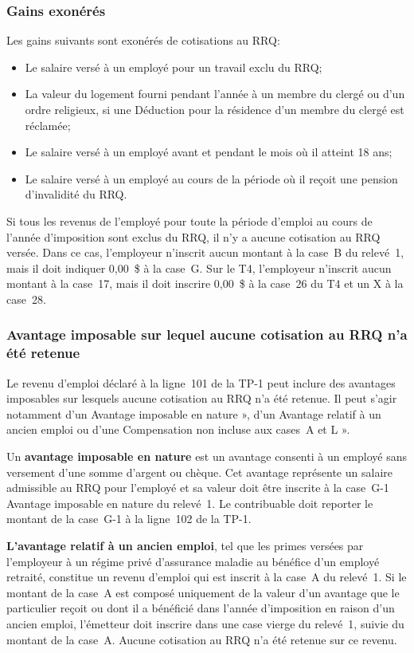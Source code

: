 \subsubsection{Gains exonérés}
Les gains suivants sont exonérés de cotisations au RRQ:
\begin{itemize}
	\item Le salaire versé à un employé pour un travail exclu du RRQ; 
	\item La valeur du logement fourni pendant l'année à un membre du clergé ou d'un ordre religieux, si une \og Déduction pour la résidence d'un membre du clergé \fg{} est réclamée;
	\item Le salaire versé à un employé avant et pendant le mois où il atteint 18 ans; 
	\item Le salaire versé à un employé au cours de la période où il reçoit une pension d'invalidité du RRQ.
\end{itemize}
\begin{note}
	Si tous les revenus de l'employé pour toute la période d'emploi au cours de l'année d'imposition sont exclus du RRQ, il n'y a aucune cotisation au RRQ versée. Dans ce cas, l'employeur n'inscrit aucun montant à la case~B du relevé~1, mais il doit indiquer 0,00~\$ à la case~G. Sur le T4, l'employeur n'inscrit aucun montant à la case~17, mais il doit inscrire 0,00~\$ à la case~26 du T4 et un \og X \fg{} à la case~28.
\end{note}

\subsubsection{Avantage imposable sur lequel aucune cotisation au RRQ n'a été retenue}
Le revenu d'emploi déclaré à la ligne~101 de la TP-1 peut inclure des avantages imposables sur lesquels aucune cotisation au RRQ n'a été retenue. Il peut s'agir notamment d'un \og Avantage imposable en nature », d'un \og Avantage relatif à un ancien emploi \fg{} ou d'une \og Compensation non incluse aux cases~A et L ».

Un \textbf{avantage imposable en nature} est un avantage consenti à un employé sans versement d'une somme d'argent ou chèque. Cet avantage représente un salaire admissible au RRQ pour l'employé et sa valeur doit être inscrite à la case~G-1 \og Avantage imposable en nature \fg{} du relevé~1. Le contribuable doit reporter le montant de la case~G-1 à la ligne~102 de la TP-1.

\textbf{L'avantage relatif à un ancien emploi}, tel que les primes versées par l'employeur à un régime privé d'assurance maladie au bénéfice d'un employé retraité, constitue un revenu d'emploi qui est inscrit à la case~A du relevé~1. Si le montant de la case~A est composé uniquement de la valeur d'un avantage que le particulier reçoit ou dont il a bénéficié dans l'année d'imposition en raison d'un ancien emploi, l'émetteur doit inscrire  \fg{} dans une case vierge du relevé~1, suivie du montant de la case~A. Aucune cotisation au RRQ n'a été retenue sur ce revenu.

